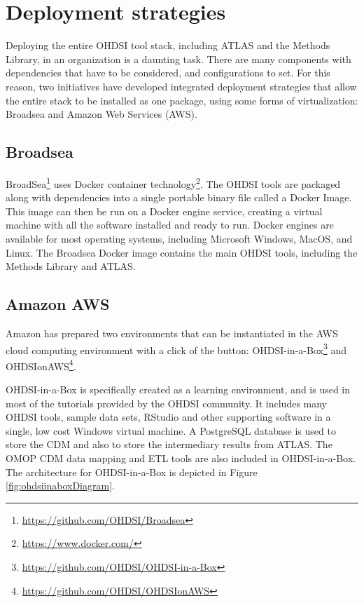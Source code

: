 \documentclass[11pt]{book}
\let\rmarkdownfootnote\footnote%
\def\footnote{\protect\rmarkdownfootnote}
\theoremstyle{definition}
\theoremstyle{definition}
\theoremstyle{definition}
\theoremstyle{remark}
\begin{document}
\hypertarget{deployment-strategies}{%
\section{Deployment strategies}\label{deployment-strategies}}

Deploying the entire OHDSI tool stack, including ATLAS and the Methods Library, in an organization is a daunting task. There are many components with dependencies that have to be considered, and configurations to set. For this reason, two initiatives have developed integrated deployment strategies that allow the entire stack to be installed as one package, using some forms of virtualization: Broadsea and Amazon Web Services (AWS). 

\hypertarget{broadsea}{%
\subsection{Broadsea}\label{broadsea}}

BroadSea\footnote{\url{https://github.com/OHDSI/Broadsea}} uses Docker container technology\footnote{\url{https://www.docker.com/}}. The OHDSI tools are packaged along with dependencies into a single portable binary file called a Docker Image. This image can then be run on a Docker engine service, creating a virtual machine with all the software installed and ready to run. Docker engines are available for most operating systems, including Microsoft Windows, MacOS, and Linux. The Broadsea Docker image contains the main OHDSI tools, including the Methods Library and ATLAS. 

\hypertarget{amazon-aws}{%
\subsection{Amazon AWS}\label{amazon-aws}}

Amazon has prepared two environments that can be instantiated in the AWS cloud computing environment with a click of the button: OHDSI-in-a-Box\footnote{\url{https://github.com/OHDSI/OHDSI-in-a-Box}} and OHDSIonAWS\footnote{\url{https://github.com/OHDSI/OHDSIonAWS}}. 

OHDSI-in-a-Box is specifically created as a learning environment, and is used in most of the tutorials provided by the OHDSI community. It includes many OHDSI tools, sample data sets, RStudio and other supporting software in a single, low cost Windows virtual machine. A PostgreSQL database is used to store the CDM and also to store the intermediary results from ATLAS. The OMOP CDM data mapping and ETL tools are also included in OHDSI-in-a-Box. The architecture for OHDSI-in-a-Box is depicted in Figure \ref{fig:ohdsiinaboxDiagram}.
\end{document}
